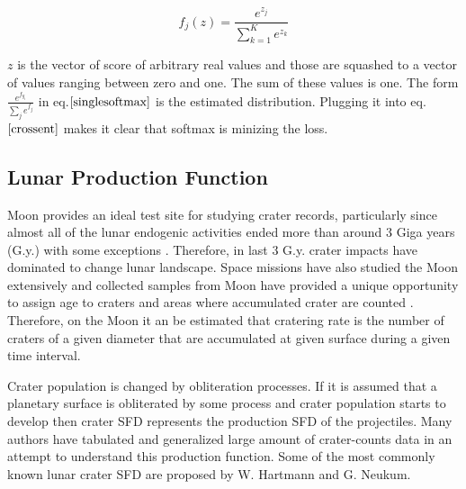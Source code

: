 \documentclass[11pt]{article}
\begin{document}
\begin{equation}
f_j(z) = \frac{e^{z_j}}{\sum_{k=1}^{K} e^{z_k}}
\end{equation}

$z$ is the vector of score of arbitrary real values and those are squashed to a vector of values ranging between zero and one. The sum of these values is one. The form $\frac{e^{f_{y_i}}}{ \sum_j e^{f_j} }$ in eq.$\ref{singlesoftmax}$ is the estimated distribution. Plugging it into eq.$\ref{crossent}$ makes it clear that softmax is minizing the loss.



\subsection{Lunar Production Function}
Moon provides an ideal test site for studying crater records, particularly since almost all of the lunar endogenic activities ended more than around 3 Giga years (G.y.) with some exceptions \cite{hiesinger2000ages}. Therefore, in last 3 G.y. crater impacts have dominated to change lunar landscape. Space missions have also studied the Moon extensively and collected samples from Moon have provided a unique opportunity to assign age to craters and areas where accumulated crater are counted \cite{stoffler2001stratigraphy}. Therefore, on the Moon it an be estimated that cratering rate is the number of craters of a given diameter that are accumulated at given surface during a given time interval.

Crater population is changed by obliteration processes. If it is assumed that a planetary surface is obliterated by some process and crater population starts to develop then crater SFD represents the production SFD of the projectiles. Many authors have tabulated and generalized large amount of crater-counts data in an attempt to understand this production function. Some of the most commonly known lunar crater SFD are proposed by W. Hartmann and G. Neukum. 
\end{document}
